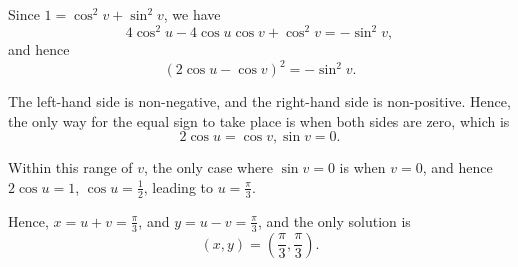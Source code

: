 \begin{enumerate}
          Since \(1 = \cos^2 v + \sin^2 v\), we have
          \[
              4 \cos^2 u - 4 \cos u \cos v + \cos^2 v = - \sin^2 v,
          \]
          and hence
          \[
              (2 \cos u - \cos v)^2 = - \sin^2 v.
          \]

          The left-hand side is non-negative, and the right-hand side is non-positive. Hence, the only way for the equal sign to take place is when both sides are zero, which is
          \[
              2 \cos u = \cos v, \sin v = 0.
          \]

          Within this range of \(v\), the only case where \(\sin v = 0\) is when \(v = 0\), and hence \(2 \cos u = 1\), \(\cos u = \frac{1}{2}\), leading to \(u = \frac{\pi}{3}\).

          Hence, \(x = u + v = \frac{\pi}{3}\), and \(y = u - v = \frac{\pi}{3}\), and the only solution is
          \[
              (x, y) = \left(\frac{\pi}{3}, \frac{\pi}{3}\right).
          \]
\end{enumerate}